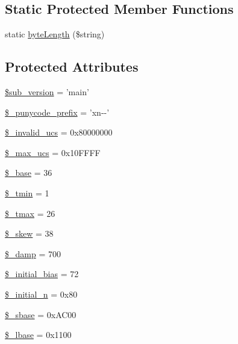 \subsection*{Static Protected Member Functions}
\begin{DoxyCompactItemize}
\item 
static \hyperlink{classidna__convert_a964eafd23cc4069f6aa9912bcdfb61c7}{byte\-Length} (\$string)
\end{DoxyCompactItemize}
\subsection*{Protected Attributes}
\begin{DoxyCompactItemize}
\item 
\hyperlink{classidna__convert_a14d96b4efeba28496661be46a6f14a5c}{\$sub\-\_\-version} = 'main'
\item 
\hyperlink{classidna__convert_a314677b13ded35e088abec26ef7c8be8}{\$\-\_\-punycode\-\_\-prefix} = 'xn-\/-\/'
\item 
\hyperlink{classidna__convert_a741bab9cbe7aec53249d714143bbe53b}{\$\-\_\-invalid\-\_\-ucs} = 0x80000000
\item 
\hyperlink{classidna__convert_aea20377d4d2659186a1901d6a66f5d58}{\$\-\_\-max\-\_\-ucs} = 0x10\-F\-F\-F\-F
\item 
\hyperlink{classidna__convert_ae8b8b5bddd4d164dea30f7097274ac24}{\$\-\_\-base} = 36
\item 
\hyperlink{classidna__convert_a25ba1aab448cedd1159da1a09fb97720}{\$\-\_\-tmin} = 1
\item 
\hyperlink{classidna__convert_a44dfb166546f087150aa6c1ffdde2473}{\$\-\_\-tmax} = 26
\item 
\hyperlink{classidna__convert_ae444bd5e85604ec097705a95ab21f144}{\$\-\_\-skew} = 38
\item 
\hyperlink{classidna__convert_af291107adc3fc7062e734fe5654a5b4c}{\$\-\_\-damp} = 700
\item 
\hyperlink{classidna__convert_a9baf9ea9ebceee6e4dffb60cce1d20bc}{\$\-\_\-initial\-\_\-bias} = 72
\item 
\hyperlink{classidna__convert_a02dd88f575541a67a6312a15af340733}{\$\-\_\-initial\-\_\-n} = 0x80
\item 
\hyperlink{classidna__convert_ab4e5849131d5a242fc67d3bb75f81899}{\$\-\_\-sbase} = 0x\-A\-C00
\item 
\hyperlink{classidna__convert_a50c50cda465aefe78b8ed69ae6cd6247}{\$\-\_\-lbase} = 0x1100
\item 

\end{DoxyCompactItemize}
